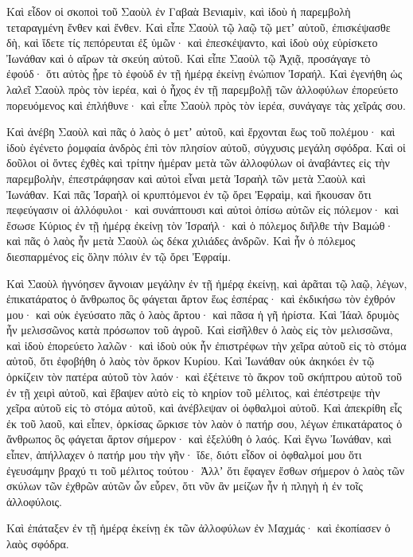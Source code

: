 {\par }{\PP {}Καὶ εἶδον οἱ σκοποὶ τοῦ Σαοὺλ ἐν Γαβαὰ Βενιαμὶν, καὶ ἰδοὺ ἡ παρεμβολὴ τεταραγμένη ἔνθεν καὶ ἔνθεν.
Καὶ εἶπε Σαοὺλ τῷ λαῷ τῷ μετʼ αὐτοῦ, ἐπισκέψασθε δὴ, καὶ ἴδετε τίς πεπόρευται ἐξ ὑμῶν· καὶ ἐπεσκέψαντο, καὶ ἰδοὺ οὐχ εὑρίσκετο Ἰωνάθαν καὶ ὁ αἴρων τὰ σκεύη αὐτοῦ.
Καὶ εἶπε Σαοὺλ τῷ Ἀχιᾷ, προσάγαγε τὸ ἐφούδ· ὅτι αὐτὸς ᾗρε τὸ ἐφοὺδ ἐν τῇ ἡμέρᾳ ἐκείνῃ ἐνώπιον Ἰσραήλ.
Καὶ ἐγενήθη ὡς λαλεῖ Σαοὺλ πρὸς τὸν ἱερέα, καὶ ὁ ἦχος ἐν τῇ παρεμβολῇ τῶν ἀλλοφύλων ἐπορεύετο πορευόμενος καὶ ἐπλήθυνε· καὶ εἶπε Σαοὺλ πρὸς τὸν ἱερέα, συνάγαγε τὰς χεῖράς σου.
\par }{\PP {}Καὶ ἀνέβη Σαοὺλ καὶ πᾶς ὁ λαὸς ὁ μετʼ αὐτοῦ, καὶ ἔρχονται ἕως τοῦ πολέμου· καὶ ἰδοὺ ἐγένετο ῥομφαία ἀνδρὸς ἐπὶ τὸν πλησίον αὐτοῦ, σύγχυσις μεγάλη σφόδρα.
Καὶ οἱ δοῦλοι οἱ ὄντες ἐχθὲς καὶ τρίτην ἡμέραν μετὰ τῶν ἀλλοφύλων οἱ ἀναβάντες εἰς τὴν παρεμβολὴν, ἐπεστράφησαν καὶ αὐτοὶ εἶναι μετὰ Ἰσραὴλ τῶν μετὰ Σαοὺλ καὶ Ἰωνάθαν.
Καὶ πᾶς Ἰσραὴλ οἱ κρυπτόμενοι ἐν τῷ ὄρει Ἐφραὶμ, καὶ ἤκουσαν ὅτι πεφεύγασιν οἱ ἀλλόφυλοι· καὶ συνάπτουσι καὶ αὐτοὶ ὀπίσω αὐτῶν εἰς πόλεμον·
καὶ ἔσωσε Κύριος ἐν τῇ ἡμέρᾳ ἐκείνῃ τὸν Ἰσραήλ· καὶ ὁ πόλεμος διῆλθε τὴν Βαμώθ· καὶ πᾶς ὁ λαὸς ἦν μετὰ Σαοὺλ ὡς δέκα χιλιάδες ἀνδρῶν. Καὶ ἦν ὁ πόλεμος διεσπαρμένος εἰς ὅλην πόλιν ἐν τῷ ὄρει Ἐφραίμ.
\par }{\PP {}Καὶ Σαοὺλ ἠγνόησεν ἄγνοιαν μεγάλην ἐν τῇ ἡμέρᾳ ἐκείνῃ, καὶ ἀρᾶται τῷ λαῷ, λέγων, ἐπικατάρατος ὁ ἄνθρωπος ὃς φάγεται ἄρτον ἕως ἑσπέρας· καὶ ἐκδικήσω τὸν ἐχθρόν μου· καὶ οὐκ ἐγεύσατο πᾶς ὁ λαὸς ἄρτου·
καὶ πᾶσα ἡ γῆ ἠρίστα. Καὶ Ἰάαλ δρυμὸς ἦν μελισσῶνος κατὰ πρόσωπον τοῦ ἀγροῦ.
Καὶ εἰσῆλθεν ὁ λαὸς εἰς τὸν μελισσῶνα, καὶ ἰδοὺ ἐπορεύετο λαλῶν· καὶ ἰδοὺ οὐκ ἦν ἐπιστρέφων τὴν χεῖρα αὐτοῦ εἰς τὸ στόμα αὐτοῦ, ὅτι ἐφοβήθη ὁ λαὸς τὸν ὅρκον Κυρίου.
Καὶ Ἰωνάθαν οὐκ ἀκηκόει ἐν τῷ ὁρκίζειν τὸν πατέρα αὐτοῦ τὸν λαόν· καὶ ἐξέτεινε τὸ ἄκρον τοῦ σκήπτρου αὐτοῦ τοῦ ἐν τῇ χειρὶ αὐτοῦ, καὶ ἔβαψεν αὐτὸ εἰς τὸ κηρίον τοῦ μέλιτος, καὶ ἐπέστρεψε τὴν χεῖρα αὐτοῦ εἰς τὸ στόμα αὐτοῦ, καὶ ἀνέβλεψαν οἱ ὀφθαλμοὶ αὐτοῦ.
Καὶ ἀπεκρίθη εἷς ἐκ τοῦ λαοῦ, καὶ εἶπεν, ὁρκίσας ὥρκισε τὸν λαὸν ὁ πατήρ σου, λέγων ἐπικατάρατος ὁ ἄνθρωπος ὃς φάγεται ἄρτον σήμερον· καὶ ἐξελύθη ὁ λαός.
Καὶ ἔγνω Ἰωνάθαν, καὶ εἶπεν, ἀπήλλαχεν ὁ πατήρ μου τὴν γῆν· ἴδε, διότι εἶδον οἱ ὀφθαλμοί μου ὅτι ἐγευσάμην βραχύ τι τοῦ μέλιτος τούτου·
Ἀλλʼ ὅτι ἔφαγεν ἔσθων σήμερον ὁ λαὸς τῶν σκύλων τῶν ἐχθρῶν αὐτῶν ὧν εὗρεν, ὅτι νῦν ἂν μείζων ἦν ἡ πληγὴ ἡ ἐν τοῖς ἀλλοφύλοις.
\par }{\PP {}Καὶ ἐπάταξεν ἐν τῇ ἡμέρᾳ ἐκείνῃ ἐκ τῶν ἀλλοφύλων ἐν Μαχμάς· καὶ ἐκοπίασεν ὁ λαὸς σφόδρα.
}
